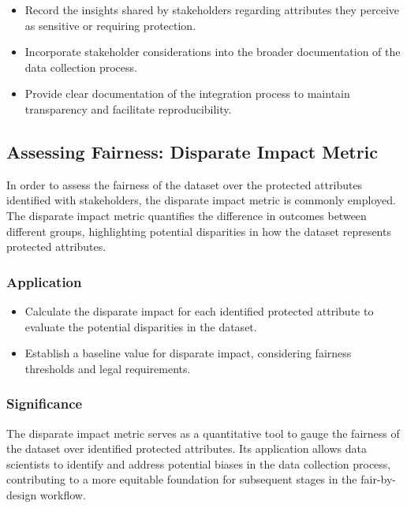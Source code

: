 \documentclass[12pt,a4paper,openright,twoside]{book}
\begin{document}
\begin{itemize}

    \item Record the insights shared by stakeholders regarding attributes they perceive as sensitive or requiring protection.

    \item Incorporate stakeholder considerations into the broader documentation of the data collection process.

    \item Provide clear documentation of the integration process to maintain transparency and facilitate reproducibility.

\end{itemize}

\subsection{Assessing Fairness: Disparate Impact Metric}

In order to assess the fairness of the dataset over the protected attributes identified with stakeholders, the disparate impact metric is commonly employed. The disparate impact metric quantifies the difference in outcomes between different groups, highlighting potential disparities in how the dataset represents protected attributes.

\subsubsection{Application}

\begin{itemize}
    
    \item Calculate the disparate impact for each identified protected attribute to evaluate the potential disparities in the dataset.
    
    \item Establish a baseline value for disparate impact, considering fairness thresholds and legal requirements.

\end{itemize}

\subsubsection{Significance}

The disparate impact metric serves as a quantitative tool to gauge the fairness of the dataset over identified protected attributes. Its application allows data scientists to identify and address potential biases in the data collection process, contributing to a more equitable foundation for subsequent stages in the fair-by-design workflow.
\end{document}
